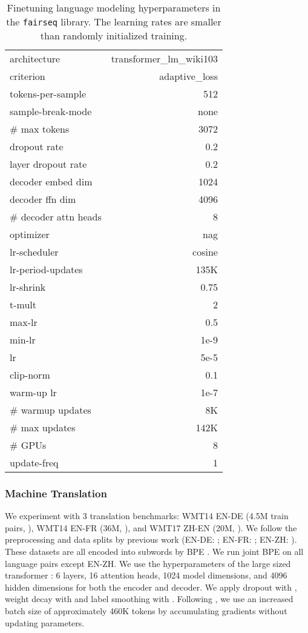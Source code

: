 \documentclass[11pt]{article}
\begin{document}
\begin{table}[h]
\small
\centering
\begin{tabular}{ |l r|}
\hline
architecture & transformer\_lm\_wiki103\\
criterion & adaptive\_loss \\
tokens-per-sample & 512 \\
sample-break-mode & none \\
\# max tokens & 3072\\
dropout rate & 0.2\\
layer dropout rate & 0.2\\
decoder embed dim  & 1024\\
decoder ffn dim  & 4096\\
\# decoder attn heads & 8\\
optimizer &  nag \\
lr-scheduler &  cosine \\
lr-period-updates &  135K \\
lr-shrink & 0.75 \\
t-mult & 2 \\
max-lr & 0.5 \\
min-lr & 1e-9 \\
lr &  5e-5 \\
clip-norm & 0.1\\
warm-up lr & 1e-7 \\
\# warmup updates & 8K \\
\# max updates &  142K \\
\# GPUs & 8 \\
update-freq & 1\\
\hline
\end{tabular}
\caption{Finetuning language modeling hyperparameters in the \texttt{fairseq} library. The learning rates are smaller than randomly initialized training.}
\label{tab:lm-ft-hyp}
\end{table}

\subsubsection{Machine Translation}
We experiment with 3 translation benchmarks: WMT14 EN-DE (4.5M train pairs, \citealp{wmt2016-findings}), WMT14 EN-FR (36M, \citealp{wmt2014-findings}), and WMT17 ZH-EN (20M, \citealp{wmt2017-findings}).
We follow the preprocessing and data splits by previous work (EN-DE: \citealp{Vaswani2017AttentionIA}; EN-FR: \citealp{Gehring2017ConvolutionalST}; EN-ZH: \citealp{Hassan2018AchievingHP, wu2018pay}).
These datasets are all encoded into subwords by BPE \cite{sennrich-etal-2016-neural}.
We run joint BPE on all language pairs except EN-ZH.
We use the hyperparameters of the large sized transformer \cite{Vaswani2017AttentionIA}: 6 layers, 16 attention heads, 1024 model dimensions, and 4096 hidden dimensions for both the encoder and decoder.
We apply dropout with , weight decay with  and label smoothing with .
Following \citet{Ott2018ScalingNM}, we use an increased batch size of approximately 460K tokens by accumulating gradients without updating parameters.
\end{document}
